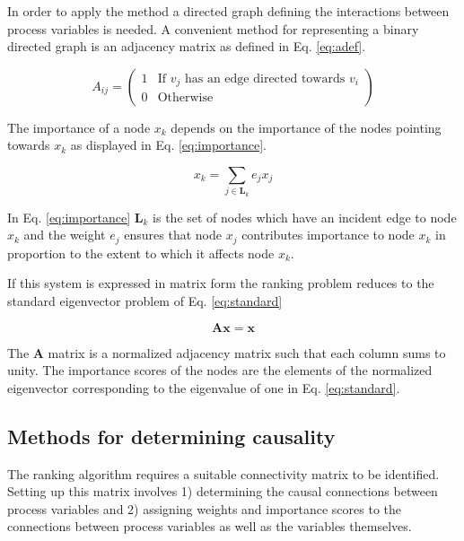 \documentclass{article}
\begin{document}
In order to apply the method a directed graph defining the interactions between process variables is needed.
A convenient method for representing a binary directed graph is an adjacency matrix as defined in Eq. \ref{eq:adef}.

\begin{equation} \label{eq:adef}
A_{ij} = \left( \begin{array}{ll}
1 & \textrm{If $v_j$ has an edge directed towards $v_i$} \\
0 &\textrm{Otherwise} \end{array} \right)
\end{equation}

The importance of a node $x_k$ depends on the importance of the nodes pointing towards $x_k$ as displayed in Eq. \ref{eq:importance}.

\begin{equation} \label{eq:importance}
x_k = \sum_{j \in \boldsymbol{L}_k} e_j x_j
\end{equation}

In Eq. \ref{eq:importance} $\boldsymbol{L}_k$ is the set of nodes which have an incident edge to node $x_k$ and the weight $e_j$ ensures that node $x_j$ contributes importance to node $x_k$ in proportion to the extent to which it affects node $x_k$.

If this system is expressed in matrix form the ranking problem reduces to the standard eigenvector problem of Eq. \ref{eq:standard}

\begin{equation} \label{eq:standard}
\boldsymbol{Ax} = \boldsymbol{x}
\end{equation}

The $\boldsymbol{A}$ matrix is a normalized adjacency matrix such that each column sums to unity.
The importance scores of the nodes are the elements of the normalized eigenvector corresponding to the eigenvalue of one in Eq. \ref{eq:standard}.

\subsection{Methods for determining causality}

The ranking algorithm requires a suitable connectivity matrix to be identified.
Setting up this matrix involves 1) determining the causal connections between process variables and 2) assigning weights and importance scores to the connections between process variables as well as the variables themselves.
\end{document}
